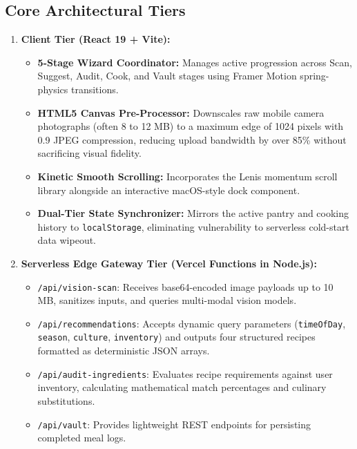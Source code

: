 \subsection*{Core Architectural Tiers}
\begin{enumerate}
    \item \textbf{Client Tier (React 19 + Vite):}
    \begin{itemize}
        \item \textbf{5-Stage Wizard Coordinator:} Manages active progression across Scan, Suggest, Audit, Cook, and Vault stages using Framer Motion spring-physics transitions.
        \item \textbf{HTML5 Canvas Pre-Processor:} Downscales raw mobile camera photographs (often 8 to 12 MB) to a maximum edge of 1024 pixels with 0.9 JPEG compression, reducing upload bandwidth by over 85\% without sacrificing visual fidelity.
        \item \textbf{Kinetic Smooth Scrolling:} Incorporates the Lenis momentum scroll library alongside an interactive macOS-style dock component.
        \item \textbf{Dual-Tier State Synchronizer:} Mirrors the active pantry and cooking history to \texttt{localStorage}, eliminating vulnerability to serverless cold-start data wipeout.
    \end{itemize}

    \item \textbf{Serverless Edge Gateway Tier (Vercel Functions in Node.js):}
    \begin{itemize}
        \item \texttt{/api/vision-scan}: Receives base64-encoded image payloads up to 10 MB, sanitizes inputs, and queries multi-modal vision models.
        \item \texttt{/api/recommendations}: Accepts dynamic query parameters (\texttt{timeOfDay}, \texttt{season}, \texttt{culture}, \texttt{inventory}) and outputs four structured recipes formatted as deterministic JSON arrays.
        \item \texttt{/api/audit-ingredients}: Evaluates recipe requirements against user inventory, calculating mathematical match percentages and culinary substitutions.
        \item \texttt{/api/vault}: Provides lightweight REST endpoints for persisting completed meal logs.
    \end{itemize}


\end{enumerate}
